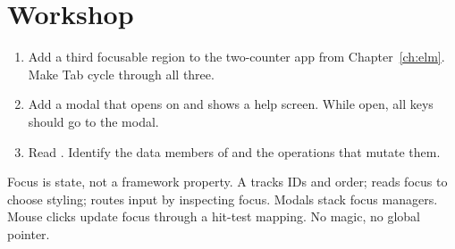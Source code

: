 \section*{Workshop}

\begin{enumerate}[leftmargin=*]
  \item Add a third focusable region to the two-counter app from
    Chapter~\ref{ch:elm}. Make Tab cycle through all three.
  \item Add a modal that opens on  and shows a help
    screen. While open, all keys should go to the modal.
  \item Read . Identify
    the data members of  and the operations
    that mutate them.
\end{enumerate}

\begin{recap}
Focus is state, not a framework property. A 
tracks IDs and order;  reads focus to choose styling;
 routes input by inspecting focus. Modals stack
focus managers. Mouse clicks update focus through a hit-test
mapping. No magic, no global pointer.
\end{recap}
